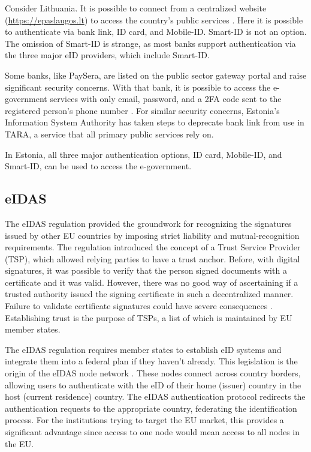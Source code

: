 Consider Lithuania. It is possible to connect from a centralized website (\url{https://epaslaugos.lt}) to access the country's public services \cite{eidasnode-lt}. Here it is possible to authenticate via bank link, ID card, and Mobile-ID. Smart-ID is not an option. The omission of Smart-ID is strange, as most banks support authentication via the three major eID providers, which include Smart-ID.

Some banks, like PaySera, are listed on the public sector gateway portal and raise significant security concerns. With that bank, it is possible to access the e-government services with only email, password, and a 2FA code sent to the registered person's phone number \cite{video-paysera}. For similar security concerns, Estonia's Information System Authority has taken steps to deprecate bank link \cite{ria-deprecates-bank-link} from use in TARA, a service that all primary public services rely on.

In Estonia, all three major authentication options, ID card, Mobile-ID, and Smart-ID, can be used to access the e-government.

\subsection{eIDAS}

The eIDAS regulation \cite{eulaw-eidas} provided the groundwork for recognizing the signatures issued by other EU countries by imposing strict liability and mutual-recognition requirements. The regulation introduced the concept of a Trust Service Provider (TSP), which allowed relying parties to have a trust anchor. Before, with digital signatures, it was possible to verify that the person signed documents with a certificate and it was valid. However, there was no good way of ascertaining if a trusted authority issued the signing certificate in such a decentralized manner. Failure to validate certificate signatures could have severe consequences \cite{seb-auth-bypass}. Establishing trust is the purpose of TSPs, a list of which is maintained by EU member states.

The eIDAS regulation requires member states to establish eID systems and integrate them into a federal plan if they haven't already. This legislation is the origin of the eIDAS node network \cite{carretero2018federated}. These nodes connect across country borders, allowing users to authenticate with the eID of their home (issuer) country in the host (current residence) country. The eIDAS authentication protocol redirects the authentication requests to the appropriate country, federating the identification process. For the institutions trying to target the EU market, this provides a significant advantage since access to one node would mean access to all nodes in the EU.

